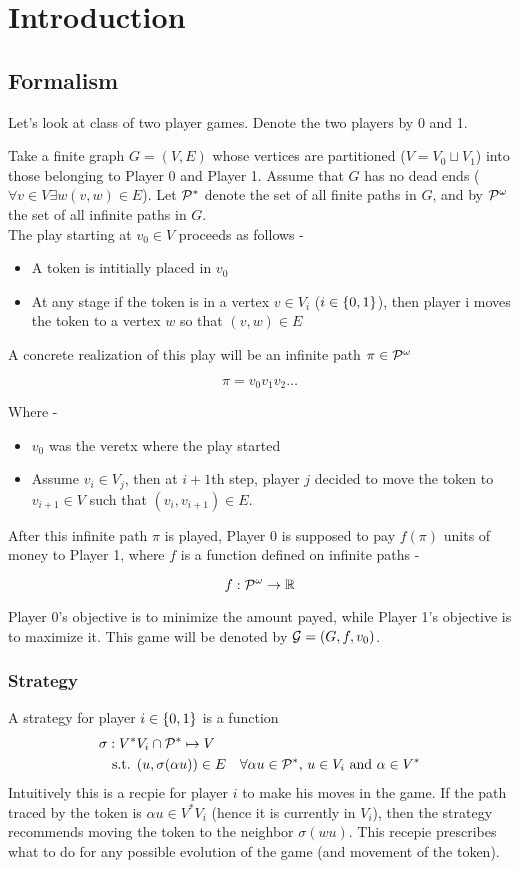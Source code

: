 \chapter{Introduction}

\section{Formalism}
\label{sec:formalism}
Let's look at class of two player games. Denote the two players by 0 and 1.

Take a finite graph $G=(V,E)$ whose vertices are partitioned ($V = V_0 \sqcup V_1$) into those belonging to Player 0 and Player 1. Assume that $G$ has no dead ends ($\forall v \in V \exists w  (v,w) \in E$). Let $\mathcal{P}^{*}$ denote the set of all finite paths in $G$, and by $\mathcal{P}^\omega$ the set of all infinite paths in $G$.\\
The play starting at $v_0 \in V$ proceeds as follows -
\begin{itemize}
  \item A token is intitially placed in $v_0$
  \item At any stage if the token is in a vertex $v \in V_i$ ($i \in \{0,1\}$), then
        player i moves the token to a vertex $w$ so that $(v,w) \in E$
\end{itemize}
A concrete realization of this play will be an infinite path $\pi \in \mathcal{P}^\omega$

\[
  \pi = v_0 v_1 v_2 \ldots
\]

Where -
\begin{itemize}
  \item $v_0$ was the veretx where the play started
  \item Assume $v_i \in V_j$, then at $i+1$th step, player $j$ decided to move the token to $v_{i+1} \in V$ such that $(v_i,v_{i+1}) \in E$.
\end{itemize}

After this infinite path $\pi$ is played, Player 0 is supposed to pay $f(\pi)$ units of money to Player 1, where $f$ is a function defined on infinite paths -

\[
    f : \mathcal{P}^\omega \to \mathbb{R}
\]

Player 0's objective is to minimize the amount payed, while Player 1's objective is to maximize it.
This game will be denoted by $\mathcal{G}=(G,f,v_0)$.

\subsection{Strategy}
A strategy for player $i \in \{0,1\}$ is a function 
\begin{align}
    \sigma &: V^{*}V_i \cap \mathcal{P}^{*} \mapsto V \\
    &\text{ s.t. } (u,\sigma(\alpha u)) \in E \quad \forall \alpha u \in \mathcal{P}^{*},\, u \in V_i \text{ and } \alpha \in V^*
\end{align}
Intuitively this is a recpie for player $i$ to make his moves in the game. If the path traced by the token is $\alpha u \in V^{*}V_i$ (hence it is currently in $V_i$), then the strategy recommends moving the token to the neighbor $\sigma(wu)$. This recepie prescribes what to do for any possible evolution of the game (and movement of the token).

